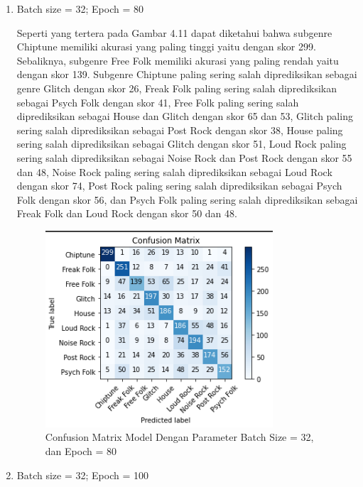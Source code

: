 \begin{enumerate}
	\item Batch size = 32; Epoch = 80
	
	Seperti yang tertera pada Gambar 4.11 dapat diketahui bahwa subgenre Chiptune memiliki akurasi yang paling tinggi yaitu dengan skor 299. Sebaliknya, subgenre Free Folk memiliki akurasi yang paling rendah yaitu dengan skor 139. Subgenre Chiptune paling sering salah diprediksikan sebagai genre Glitch dengan skor 26, Freak Folk paling sering salah diprediksikan sebagai Psych Folk dengan skor 41, Free Folk paling sering salah diprediksikan sebagai House dan Glitch dengan skor 65 dan 53, Glitch paling sering salah diprediksikan sebagai Post Rock dengan skor 38, House paling sering salah diprediksikan sebagai Glitch dengan skor 51, Loud Rock paling sering salah diprediksikan sebagai Noise Rock dan Post Rock dengan skor 55 dan 48, Noise Rock paling sering salah diprediksikan sebagai Loud Rock dengan skor 74, Post Rock paling sering salah diprediksikan sebagai Psych Folk dengan skor 56, dan Psych Folk paling sering salah diprediksikan sebagai Freak Folk dan Loud Rock dengan skor 50 dan 48.
	
	\begin{figure}[H]
		\centering
		
		\includegraphics[width=0.8\textwidth]{gambar/confusion matrix_b32_e80}
		
		\caption{Confusion Matrix Model Dengan Parameter Batch Size = 32, dan Epoch = 80}
		\label{fig:cm_b32_e80}
	\end{figure}

	\item Batch size = 32; Epoch = 100
	

\end{enumerate}
